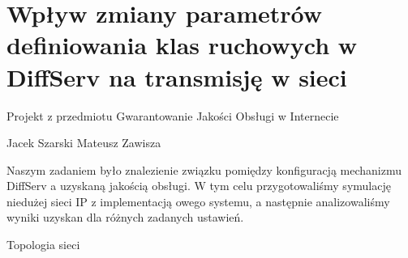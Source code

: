 \documentclass[a4paper]{article}
\begin{document}
\section{Wpływ zmiany parametrów definiowania klas ruchowych w DiffServ na transmisję w sieci}






Projekt z przedmiotu Gwarantowanie Jakości Obsługi w Internecie







Jacek Szarski
Mateusz Zawisza


Naszym zadaniem było znalezienie związku pomiędzy konfiguracją mechanizmu DiffServ a uzyskaną jakością obsługi. W tym celu przygotowaliśmy symulację niedużej sieci IP z implementacją owego systemu, a następnie analizowaliśmy wyniki uzyskan dla różnych zadanych ustawień.


Topologia sieci
\end{document}
